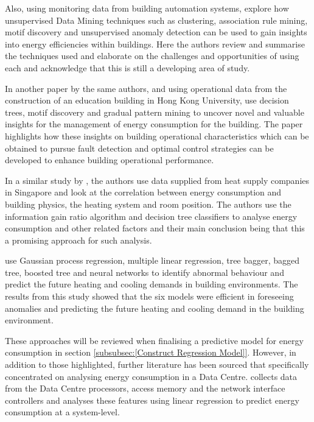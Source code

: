 \documentclass[12pt]{scrartcl}
\begin{document}
Also, using monitoring data from building automation systems, \citet{FAN2018296} explore how unsupervised Data Mining techniques such as clustering, association rule mining, motif discovery and unsupervised anomaly detection can be used to gain insights into energy efficiencies within buildings. Here the authors review and summarise the techniques used and elaborate on the challenges and opportunities of using each and acknowledge that this is still a developing area of study.  

In another paper by the same authors, and using operational data from the construction of an education building in Hong Kong University, \citet{FAN2018296} use decision trees, motif discovery and gradual pattern mining to uncover novel and valuable insights for the management of energy consumption for the building. The paper highlights how these insights on building operational characteristics which can be obtained to pursue fault detection and optimal control strategies can be developed to enhance building operational performance.   

In a similar study by \citet{ZHOU201873}, the authors use data supplied from heat supply companies in Singapore and look at the correlation between energy consumption and building physics, the heating system and room position. The authors use the information gain ratio algorithm and decision tree classifiers to analyse energy consumption and other related factors and their main conclusion being that this a promising approach for such analysis. 

\citet{AHMAD2018460} use Gaussian process regression, multiple linear regression, tree bagger, bagged tree, boosted tree and neural networks to identify abnormal behaviour and predict the future heating and cooling demands in building environments. The results from this study showed that the six models were efficient in foreseeing anomalies and predicting the future heating and cooling demand in the building environment.  

These approaches will be reviewed when finalising a predictive model for energy consumption in section \ref{subsubsec:[Construct Regression Model]}. However, in addition to those highlighted, further literature has been sourced that specifically concentrated on analysing energy consumption in a Data Centre. \citet{Makris2017} collects data from the Data Centre processors, access memory and the network interface controllers and analyses these features using linear regression to predict energy consumption at a system-level.
\end{document}

